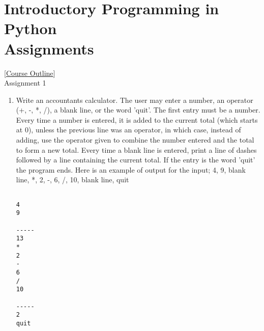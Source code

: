 \section{Introductory Programming in Python
\\   Assignments}    [\href{index.html}{Course Outline}]
\\    [\href{solutions}{Solutions}]   

\hypertarget{assignment1}{Assignment 1}
\begin{enumerate}
	\item Write an accountants calculator. The user may enter a number, an operator (+, -, *, /), a blank line, or the word 'quit'. The first entry must be a number. Every time a number is entered, it is added to the current total (which    starts at 0), unless the previous line was an operator, in which case, instead of adding, use the operator given to combine the number entered and the total to form a new total. Every time a blank line is entered, print a line of dashes followed by    a line containing the current total. If the entry is the word 'quit' the program ends. Here is an example of output for the input; 4, 9, blank line, *, 2, -, 6, /, 10, blank line, quit     
\begin{lstlisting}

4
9

-----
13
*
2
-
6
/
10

-----
2
quit
\end{lstlisting}
\end{enumerate}

